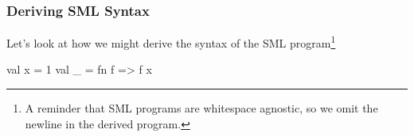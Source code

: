 \documentclass[aspectratio=169, handout]{beamer}
\newcommand{\nt}[1]{\ensuremath{{\color{ntColor}#1}}}
\begin{document}
\begin{frame}[fragile]
  \frametitle{Deriving SML Syntax}

  Let's look at how we might derive the syntax of the SML program\footnote{A reminder that SML programs are whitespace
  agnostic, so we omit the newline in the derived program.}
  \begin{codeblock}
    val x = 1
    val _ = fn f => f x
  \end{codeblock}

  \pause
  \vspace{-5pt}

  \small
  \setlength{\jot}{3pt}





\end{frame}
\end{document}
